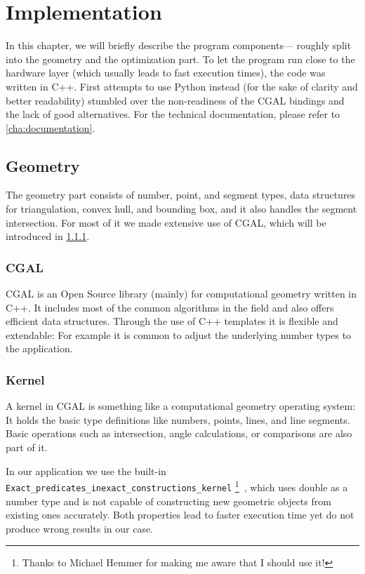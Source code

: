 \chapter{Implementation}
\label{cha:implementation}
In this chapter, we will briefly describe the program components---%
roughly split into the geometry and the optimization part.
To let the program run close to the hardware layer (which usually
leads to fast execution times), the code was written in C++. First
attempts to use Python instead (for the sake of clarity and better
readability) stumbled over the non-readiness of the \gls{CGAL} bindings and
the lack of good alternatives. For the technical documentation,
please refer to \cref{cha:documentation}.

\section{Geometry}
The geometry part consists of number, point, and segment types, 
data structures for triangulation, convex hull, and bounding box, 
and it also handles the segment intersection. For most of it we
made extensive use of \gls{CGAL}, which will be introduced in \cref{sec:CGAL}.

\subsection{CGAL}
\label{sec:CGAL}
\gls{CGAL} \cite{cgal} is an Open Source library (mainly) for computational
geometry written in C++. It includes most of the common algorithms in
the field and also offers efficient data structures. Through the use
of C++ templates it is flexible and extendable: For example it is
common to adjust the underlying number types to the application.

\subsection{Kernel}
A kernel in \gls{CGAL} is something like a computational geometry operating
system: It holds the basic type definitions like numbers, points,
lines, and line segments. Basic operations such as intersection,
angle calculations, or comparisons are also part of it.

In our application we use the built-in 
\verb|Exact_predicates_inexact_constructions_kernel|%
\footnote{Thanks to Michael Hemmer for making me aware that I should
use it!}~\cite{cgal_manual_epick}, which uses double as a number type
and is not capable of constructing new geometric objects from existing
ones accurately. Both properties lead to faster execution time yet do 
not produce wrong results in our case.

